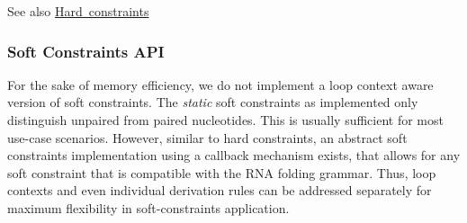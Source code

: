 \begin{DoxySeeAlso}{See also}
\mbox{\hyperlink{group__hard__constraints}{Hard constraints}}
\end{DoxySeeAlso}
\hypertarget{folding_grammar_sec_constraints_soft_api}{}\subsubsection{Soft Constraints A\+PI}\label{folding_grammar_sec_constraints_soft_api}
For the sake of memory efficiency, we do not implement a loop context aware version of soft constraints. The {\itshape static} soft constraints as implemented only distinguish unpaired from paired nucleotides. This is usually sufficient for most use-\/case scenarios. However, similar to hard constraints, an abstract soft constraints implementation using a callback mechanism exists, that allows for any soft constraint that is compatible with the R\+NA folding grammar. Thus, loop contexts and even individual derivation rules can be addressed separately for maximum flexibility in soft-\/constraints application.

